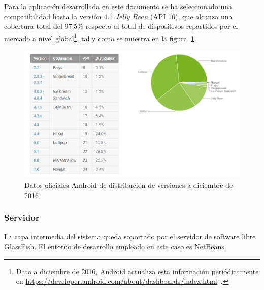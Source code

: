 Para la aplicación desarrollada en este documento se ha seleccionado una compatibilidad hasta la versión 4.1 \textit{Jelly Bean} (API 16), que alcanza una cobertura total del 97,5\% respecto al total de dispositivos repartidos por el mercado a nivel global\footnote{Dato a diciembre de 2016, Android actualiza esta información periódicamente en \url{https://developer.android.com/about/dashboards/index.html}~\cite{AnDev}.}, tal y como se muestra en la figura~\ref{fig:androidDistribution}.

\begin{figure}
	\centering
	\includegraphics[width=\linewidth,height=\textheight,keepaspectratio]{Images/androidDistribution}
	\caption{Datos oficiales Android de distribución de versiones a diciembre de 2016}
	\label{fig:androidDistribution}
\end{figure}

\subsubsection{Servidor}

La capa intermedia del sistema queda soportado por el servidor de software libre GlassFish. El entorno de desarrollo empleado en este caso es NetBeans.

